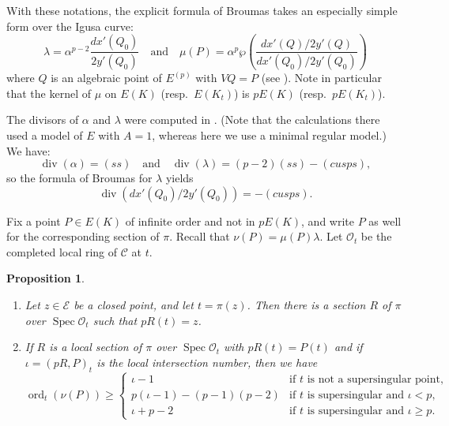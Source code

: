 \documentclass[12pt,reqno]{amsart}
\numberwithin{equation}{section}
\theoremstyle{plain}
\newtheorem{prop}[subsection]{Proposition}
\theoremstyle{definition}
\theoremstyle{remark}
\newcommand{\CC}{\mathcal{C}}
\newcommand{\EE}{\mathcal{E}}
\newcommand{\OO}{\mathcal{O}}
\newcommand{\<}{\langle}
\renewcommand{\>}{\rangle}
\DeclareMathOperator{\ord}{ord}
\DeclareMathOperator{\dvsr}{div}
\DeclareMathOperator{\spec}{Spec}
\numberwithin{equation}{section}
\renewcommand{\and}{\quad\text{and}\quad}
\begin{document}
With these notations, the explicit formula of Broumas takes an
especially simple form over the Igusa curve:
\begin{equation}\label{eq:Broumas2}
\lambda=\alpha^{p-2}\frac{dx'(Q_0)}{2y'(Q_0)}
  \and
  \mu(P)=\alpha^p\wp\left(
    \frac{dx'(Q)/2y'(Q)}{dx'(Q_0)/2y'(Q_0)}\right)  
\end{equation}
where $Q$ is an algebraic point of $E^{(p)}$ with $VQ=P$ (see
\cite[Thm.~4.1 and \S4.2]{Broumas97}).  Note in particular that the
kernel of $\mu$ on $E(K)$ (resp.~$E(K_t)$) is $pE(K)$
(resp.~$pE(K_t)$).

The divisors of $\alpha$ and $\lambda$ were computed in
\cite[\S7]{Ulmer91}.  (Note that the calculations there used a model
of $E$ with $A=1$, whereas here we use a minimal regular model.)
We have:
\begin{equation}\label{eq:divs1}
\dvsr(\alpha)=(ss)\and\dvsr(\lambda)=(p-2)(ss)-(cusps),  
\end{equation}
so the formula of Broumas for $\lambda$ yields
\begin{equation}\label{eq:divs2}
  \dvsr\left(dx'(Q_0)/2y'(Q_0)\right)=-(cusps).
\end{equation}

Fix a point $P\in E(K)$ of infinite order and not in $pE(K)$, and
write $P$ as well for the corresponding section of $\pi$.  Recall that
$\nu(P)=\mu(P)\lambda$.  Let $\OO_t$ be the completed local ring of
$\CC$ at $t$.

\begin{prop}\label{prop:local-points-and-bounds}\mbox{}
  \begin{enumerate}
  \item   Let $z\in\EE$ be a closed point, and let $t=\pi(z)$.  Then
    there is a section $R$ of $\pi$ over $\spec\OO_t$ such that $pR(t)=z$.
  \item If $R$ is a local section of $\pi$ over $\spec\OO_t$ with
    $pR(t)=P(t)$ and if $\iota=(pR,P)_t$ is the local intersection
    number, then we have
\[\ord_t(\nu(P))\ge
  \begin{cases}
    \iota-1&\text{if $t$ is not a supersingular point,}\\
    p(\iota-1)-(p-1)(p-2)
       &\text{if $t$ is supersingular and $\iota< p$,}\\
    \iota+p-2
       &\text{if $t$ is supersingular and $\iota\ge p$.}
  \end{cases}\]
  \end{enumerate}
\end{prop}
\end{document}
